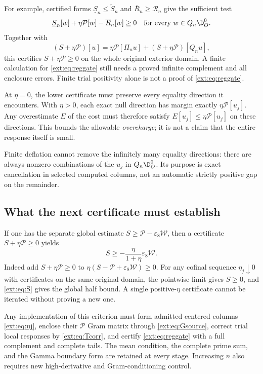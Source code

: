 \documentclass[11pt,a4paper]{article}
\numberwithin{equation}{section}
\theoremstyle{definition}\newtheorem{definition}[theorem]{Definition}
\theoremstyle{remark}\newtheorem{remark}[theorem]{Remark}
\begin{document}
For example, certified forms $\underline S_n\le\widetilde S_n$ and $\overline R_n\ge\mathcal R_n$ give the sufficient test
\begin{equation}\label{ext:eq:reggate}
 \underline S_n[w]+\eta\mathcal P[w]-\overline R_n[w]\ge0
 \quad\hbox{for every }w\in Q_n\D_O^0.
\end{equation}
Together with
\begin{equation}\label{ext:eq:regblock}
 (S+\eta\mathcal P)[u]=\eta\mathcal P[\Pi_nu]+(S+\eta\mathcal P)[Q_nu],
\end{equation}
this certifies $S+\eta\mathcal P\ge0$ on the whole original exterior domain. A finite calculation for \eqref{ext:eq:reggate} still needs a proved infinite complement and all enclosure errors. Finite trial positivity alone is not a proof of \eqref{ext:eq:reggate}.

At $\eta=0$, the lower certificate must preserve every equality direction it encounters. With $\eta>0$, each exact null direction has margin exactly $\eta\mathcal P[u_j]$. Any overestimate $E$ of the cost must therefore satisfy $E[u_j]\le\eta\mathcal P[u_j]$ on these directions. This bounds the allowable \emph{overcharge}; it is not a claim that the entire response itself is small.

Finite deflation cannot remove the infinitely many equality directions: there are always nonzero combinations of the $u_j$ in $Q_n\D_O^0$. Its purpose is exact cancellation in selected computed columns, not an automatic strictly positive gap on the remainder.

\subsection{What the next certificate must establish}
If one has the separate global estimate $S\ge\mathcal P-\varepsilon_8\mathcal W$, then a certificate $S+\eta\mathcal P\ge0$ yields
\begin{equation}\label{ext:eq:epsilon}
 S\ge-\frac{\eta}{1+\eta}\varepsilon_8\mathcal W.
\end{equation}
Indeed add $S+\eta\mathcal P\ge0$ to $\eta(S-\mathcal P+\varepsilon_8\mathcal W)\ge0$. For any cofinal sequence $\eta_j\downarrow0$ with certificates on the same original domain, the pointwise limit gives $S\ge0$, and \eqref{ext:eq:S} gives the global half bound. A single positive-$\eta$ certificate cannot be iterated without proving a new one.

Any implementation of this criterion must form admitted centered columns \eqref{ext:eq:uj}, enclose their $\mathcal P$ Gram matrix through \eqref{ext:eq:Gsource}, correct trial local responses by \eqref{ext:eq:Tcorr}, and certify \eqref{ext:eq:reggate} with a full complement and complete tails. The mean condition, the complete prime sum, and the Gamma boundary form are retained at every stage. Increasing $n$ also requires new high-derivative and Gram-conditioning control.
\end{document}
